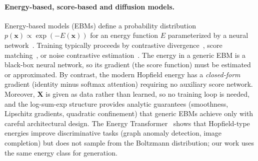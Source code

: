 \paragraph{Energy-based, score-based and diffusion models.}
Energy-based models (EBMs) define a probability distribution $p(\mathbf{x})\propto\exp(-E(\mathbf{x}))$ for an energy function $E$ parameterized by a neural network~\cite{lecunTutorialEnergyBased2006}. Training typically proceeds by contrastive divergence~\cite{hintonTrainingProductsExperts2002}, score matching~\cite{hyvarinen2005estimation}, or noise contrastive estimation~\cite{gutmannHyvaerinenNoiseContrastive2010,songHowTrainEnergyBased2021}. The energy in a generic EBM is a black-box neural network, so its gradient (the score function) must be estimated or approximated. By contrast, the modern Hopfield energy has a \emph{closed-form} gradient (identity minus softmax attention) requiring no auxiliary score network. Moreover, $\mathbf{X}$ is given as data rather than learned, so no training loop is needed, and the log-sum-exp structure provides analytic guarantees (smoothness, Lipschitz gradients, quadratic confinement) that generic EBMs achieve only with careful architectural design. The Energy Transformer~\cite{hooverEnergyTransformer2024} shows that Hopfield-type energies improve discriminative tasks (graph anomaly detection, image completion) but does not sample from the Boltzmann distribution; our work uses the same energy class for generation.

